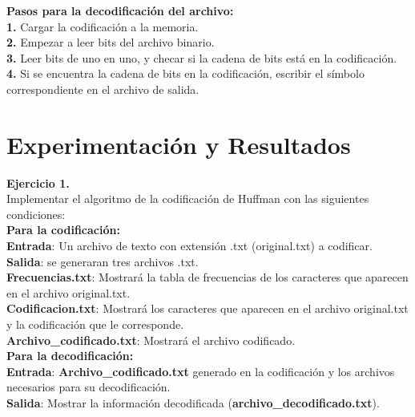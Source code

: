 \documentclass[12pt]{report}
\begin{document}
	\newpage
	
	\textbf{Pasos para la decodificación del archivo:}\\
	\textbf{1. }Cargar la codificación a la memoria.\\
	\textbf{2. }Empezar a leer bits del archivo binario.\\
	\textbf{3. }Leer bits de uno en uno, y checar si la cadena de bits está en la codificación.\\
	\textbf{4. }Si se encuentra la cadena de bits en la codificación, escribir el símbolo correspondiente en el archivo de salida.\\
	
	
	

	\section{Experimentación y Resultados}	
	\textbf{Ejercicio 1.}\\
Implementar el algoritmo de la codificación de Huffman con las siguientes condiciones:\\

\textbf{Para la codificación:}\\

\textbf{Entrada}: Un archivo de texto con extensión .txt (original.txt) a codificar.\\

\textbf{Salida}: se generaran tres archivos .txt.\\
\textbf{Frecuencias.txt}: Mostrará la tabla de frecuencias de los caracteres que
aparecen en el archivo original.txt.\\
\textbf{Codificacion.txt}: Mostrará los caracteres que aparecen en el archivo
original.txt y la codificación que le corresponde.\\
\textbf{Archivo\_codificado.txt}: Mostrará el archivo codificado.\\

\textbf{Para la decodificación:}\\

\textbf{Entrada}: \textbf{Archivo\_codificado.txt} generado en la codificación y los archivos necesarios para su decodificación.\\

\textbf{Salida}: Mostrar la información decodificada (\textbf{archivo\_decodificado.txt}).\\

 \newpage
	
\end{document}

